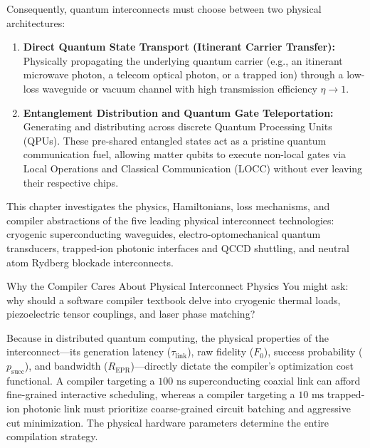 Consequently, quantum interconnects must choose between two physical architectures:
\begin{enumerate}
    \item \textbf{Direct Quantum State Transport (Itinerant Carrier Transfer):} Physically propagating the underlying quantum carrier (e.g., an itinerant microwave photon, a telecom optical photon, or a trapped ion) through a low-loss waveguide or vacuum channel with high transmission efficiency $\eta \to 1$.
    \item \textbf{Entanglement Distribution and Quantum Gate Teleportation:} Generating and distributing  across discrete Quantum Processing Units (QPUs). These pre-shared entangled states act as a pristine quantum communication fuel, allowing matter qubits to execute non-local gates via Local Operations and Classical Communication (LOCC) without ever leaving their respective chips.
\end{enumerate}

This chapter investigates the physics, Hamiltonians, loss mechanisms, and compiler abstractions of the five leading physical interconnect technologies: cryogenic superconducting waveguides, electro-optomechanical quantum transducers, trapped-ion photonic interfaces and QCCD shuttling, and neutral atom Rydberg blockade interconnects.

\begin{insightbox}{Why the Compiler Cares About Physical Interconnect Physics}
You might ask: why should a software compiler textbook delve into cryogenic thermal loads, piezoelectric tensor couplings, and laser phase matching? 

Because in distributed quantum computing, the physical properties of the interconnect---its generation latency ($\tau_{\text{link}}$), raw fidelity ($F_0$), success probability ($p_{\text{succ}}$), and bandwidth ($R_{\text{EPR}}$)---directly dictate the compiler's optimization cost functional. A compiler targeting a $100\text{ ns}$ superconducting coaxial link can afford fine-grained interactive scheduling, whereas a compiler targeting a $10\text{ ms}$ trapped-ion photonic link must prioritize coarse-grained circuit batching and aggressive cut minimization. The physical hardware parameters determine the entire compilation strategy.
\end{insightbox}


